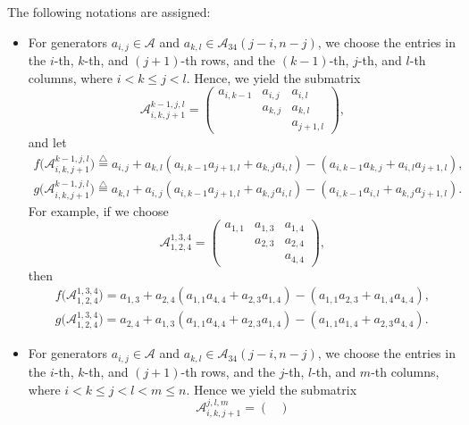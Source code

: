 \documentclass[pdftex]{sigma}
\numberwithin{equation}{section}
\def\lrb#1{\left(#1\right)}
\def\A{\mathscr{A}}
\begin{document}
The following notations are assigned:
\begin{itemize}\itemsep=0pt
\item For generators $a_{i, j} \in \A$ and $a_{k, l} \in \A_{34}(j-i, n-j)$, we choose the entries in the $i$-th, $k$-th, and $(j+1)$-th rows, and the $(k-1)$-th, $j$-th, and $l$-th columns, where $i < k \leq j < l$.
 Hence, we yield the submatrix
\begin{equation}\label{eqn-A-1}
\A_{i,k,j+1}^{k-1,j,l}=
\begin{pmatrix}
 a_{i,k-1}& a_{i,j} & a_{i,l}\\
 & a_{k,j} & a_{k, l}\\
 & & a_{j+1,l}
 \end{pmatrix}
,
\end{equation}
and let
\begin{gather}
f\bigl(\A_{i,k,j+1}^{k-1,j,l}\bigr)\overset{\bigtriangleup}{=} a_{i, j}+ a_{k, l} \lrb{a_{i, k-1}a_{j+1, l} + a_{k, j }a_{i, l}}-\lrb{a_{i, k-1}a_{k, j}+a_{i, l}a_{j+1, l}}, \label{eqn:natural}\\
g\bigl(\A_{i,k,j+1}^{k-1,j,l}\bigr)\overset{\bigtriangleup}{=} a_{k, l}+ a_{i, j}\lrb{a_{i, k-1}a_{j+1, l} + a_{k, j }a_{i, l}}-\lrb{a_{i, k-1}a_{i, l}+a_{k, j}a_{j+1, l}}. \label{eqn:sharp}
\end{gather}
For example, if we choose
\begin{equation*}
\A_{1,2,4}^{1,3,4}=
 \begin{pmatrix}
 a_{1,1}&a_{1,3} & a_{1,4}\\
 & a_{2,3} & a_{2, 4}\\
 & & a_{4,4}
 \end{pmatrix}
,
\end{equation*}
then
\begin{gather*}
f\bigl(\A_{1,2,4}^{1,3,4}\bigr)= a_{1, 3}+ a_{2, 4} \lrb{a_{1, 1}a_{4, 4} + a_{2, 3 }a_{1, 4}}-\lrb{a_{1, 1}a_{2, 3}+a_{1, 4}a_{4, 4}}, \\
g\bigl(\A_{1,2,4}^{1,3,4}\bigr)= a_{2, 4}+ a_{1, 3}\lrb{a_{1, 1}a_{4, 4} + a_{2, 3 }a_{1, 4}}-\lrb{a_{1, 1}a_{1, 4}+a_{2, 3}a_{4, 4}}.
\end{gather*}
 \item For generators $a_{i, j} \in \A$ and $a_{k, l} \in \A_{34}(j-i, n-j)$, we choose the entries in the $i$-th, $k$-th, and $(j+1)$-th rows, and the $j$-th, $l$-th, and $m$-th columns, where $i<k\leq j<l<m\leq n$.
 Hence we yield the submatrix
\begin{equation}\label{eqn-A-2}
\A_{i,k,j+1}^{j,l,m}=
 \begin{pmatrix}

\end{pmatrix}
\end{equation}
\end{itemize}
\end{document}
